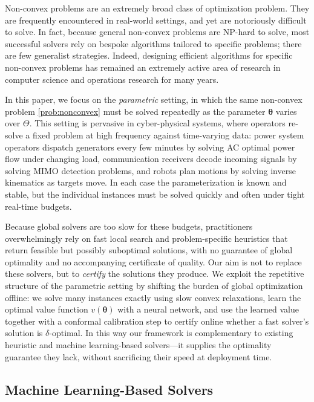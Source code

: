 \documentclass[10pt]{article} %
\theoremstyle{plain}
\theoremstyle{definition}
\theoremstyle{remark}
\begin{document}
Non-convex problems are an extremely broad class of optimization problem. They are frequently encountered in real-world settings, and yet are notoriously difficult to solve. In fact, because general non-convex problems are NP-hard to solve, most successful solvers rely on bespoke algorithms tailored to specific problems; there are few generalist strategies. Indeed, designing efficient algorithms for specific non-convex problems has remained an extremely active area of research in computer science and operations research for many years.

In this paper, we focus on the \emph{parametric} setting, in which the same non-convex problem \cref{prob:nonconvex}{}{} must be solved repeatedly as the parameter $\bm{\theta}$ varies over $\Theta$. This setting is pervasive in cyber-physical systems, where operators re-solve a fixed problem at high frequency against time-varying data: power system operators dispatch generators every few minutes by solving AC optimal power flow under changing load, communication receivers decode incoming signals by solving MIMO detection problems, and robots plan motions by solving inverse kinematics as targets move. In each case the parameterization is known and stable, but the individual instances must be solved quickly and often under tight real-time budgets.

Because global solvers are too slow for these budgets, practitioners overwhelmingly rely on fast local search and problem-specific heuristics that return feasible but possibly suboptimal solutions, with no guarantee of global optimality and no accompanying certificate of quality. Our aim is not to replace these solvers, but to \emph{certify} the solutions they produce. We exploit the repetitive structure of the parametric setting by shifting the burden of global optimization offline: we solve many instances exactly using slow convex relaxations, learn the optimal value function $v(\bm{\theta})$ with a neural network, and use the learned value together with a conformal calibration step to certify online whether a fast solver's solution is $\delta$-optimal. In this way our framework is complementary to existing heuristic and machine learning-based solvers---it supplies the optimality guarantee they lack, without sacrificing their speed at deployment time.

\subsection*{Machine Learning-Based Solvers}
\end{document}
